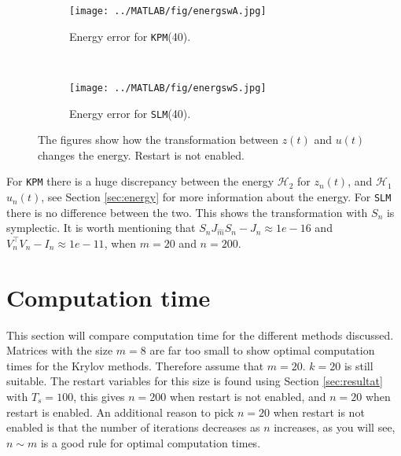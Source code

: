 \begin{figure}[H]
        \centering
        \begin{subfigure}[b]{0.3\textwidth}
                \texttt{[image: ../MATLAB/fig/energswA.jpg]}
                \caption{ Energy error for \texttt{KPM}(40). }
                \label{fig:energyswA}
        \end{subfigure}
        ~
		\begin{subfigure}[b]{0.3\textwidth}
                \texttt{[image: ../MATLAB/fig/energswS.jpg]}
                \caption{ Energy error for \texttt{SLM}(40). }
                \label{fig:energswS}
        \end{subfigure}        
        \caption{ The figures show how the transformation between $z(t)$ and $u(t)$ changes the energy. Restart is not enabled.}
        \label{fig:energs}
\end{figure}
\noindent For \texttt{KPM} there is a huge discrepancy between the energy $\mathcal{H}_2$ for $z_{n}(t)$, and $\mathcal{H}_1$ $u_{n}(t)$, see Section \ref{sec:energy} for more information about the energy. For \texttt{SLM} there is no difference between the two. This shows the transformation with $S_n$ is symplectic. It is worth mentioning that $S_n J_{\hat{m}}S_n - J_n \approx 1e-16$ and $V_n^\top V_n - I_n \approx 1e-11$, when $m = 20$ and $n = 200$.

\section{Computation time}%
\label{sec:cruntime}
This section will compare computation time for the different methods discussed. Matrices with the size $m = 8$ are far too small to show optimal computation times for the Krylov methods. Therefore assume that $m = 20$. $k = 20$ is still suitable. The restart variables for this size is found using Section \ref{sec:resultat} with $T_s = 100$, this gives $n = 200$ when restart is not enabled, and $n = 20$ when restart is enabled. An additional reason to pick $n = 20$ when restart is not enabled is that the number of iterations decreases as $n$ increases, as you will see,  $n \sim m$ is a good rule for optimal computation times.

